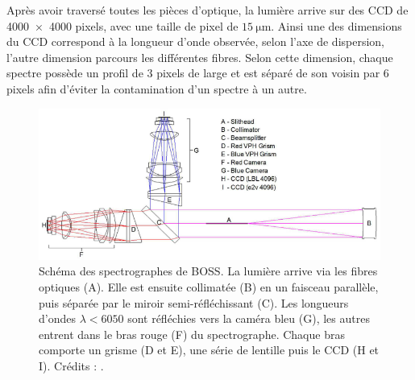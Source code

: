 Après avoir traversé toutes les pièces d'optique, la lumière arrive sur des CCD de \num{4000x4000} pixels, avec une taille de pixel de $\SI{15}{\micro\meter}$. Ainsi une des dimensions du CCD correspond à la longueur d'onde observée, selon l'axe de dispersion, l'autre dimension parcours les différentes fibres. Selon cette dimension, chaque spectre possède un profil de 3 pixels de large et  est séparé de son voisin par 6 pixels afin d'éviter la contamination d'un spectre à un autre.
\begin{figure}
  \centering
  \includegraphics[scale=0.5]{SchemaSpectro}
  \caption{Schéma des spectrographes de BOSS. La lumière arrive via les fibres optiques (A). Elle est ensuite collimatée (B) en un faisceau parallèle, puis séparée par le miroir semi-réfléchissant (C). Les longueurs d'ondes $\lambda < \num{6050}$ sont réfléchies vers la caméra bleu (G), les autres entrent dans le bras rouge (F) du spectrographe. Chaque bras comporte un grisme (D et E), une série de lentille puis le CCD (H et I). Crédits : \textcite{Smee2012}.}
  \label{fig:SchemaSpectro}
\end{figure}

